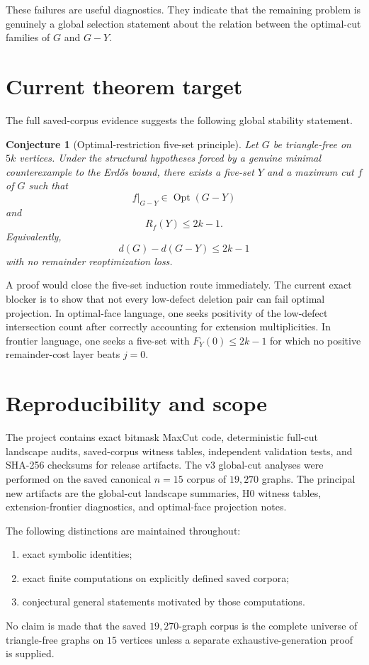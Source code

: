 \documentclass[11pt]{article}
\newtheorem{conjecture}{Conjecture}
\newcommand{\dd}{d}
\newcommand{\Opt}{\operatorname{Opt}}
\begin{document}
These failures are useful diagnostics.  They indicate that the remaining
problem is genuinely a global selection statement about the relation
between the optimal-cut families of $G$ and $G-Y$.

\section{Current theorem target}

The full saved-corpus evidence suggests the following global stability
statement.

\begin{conjecture}[Optimal-restriction five-set principle]
Let $G$ be triangle-free on $5k$ vertices.  Under the structural hypotheses
forced by a genuine minimal counterexample to the Erd\H{o}s bound, there
exists a five-set $Y$ and a maximum cut $f$ of $G$ such that
\[
f|_{G-Y}\in\Opt(G-Y)
\]
and
\[
R_f(Y)\le 2k-1.
\]
Equivalently,
\[
\dd(G)-\dd(G-Y)\le2k-1
\]
with no remainder reoptimization loss.
\end{conjecture}

A proof would close the five-set induction route immediately.  The current
exact blocker is to show that not every low-defect deletion pair can fail
optimal projection.  In optimal-face language, one seeks positivity of the
low-defect intersection count after correctly accounting for extension
multiplicities.  In frontier language, one seeks a five-set with
$F_Y(0)\le2k-1$ for which no positive remainder-cost layer beats $j=0$.

\section{Reproducibility and scope}

The project contains exact bitmask MaxCut code, deterministic full-cut
landscape audits, saved-corpus witness tables, independent validation tests,
and SHA-256 checksums for release artifacts.  The v3 global-cut analyses
were performed on the saved canonical $n=15$ corpus of $19{,}270$ graphs.
The principal new artifacts are the global-cut landscape summaries, H0
witness tables, extension-frontier diagnostics, and optimal-face projection
notes.

The following distinctions are maintained throughout:
\begin{enumerate}
\item exact symbolic identities;
\item exact finite computations on explicitly defined saved corpora;
\item conjectural general statements motivated by those computations.
\end{enumerate}
No claim is made that the saved $19{,}270$-graph corpus is the complete
universe of triangle-free graphs on $15$ vertices unless a separate
exhaustive-generation proof is supplied.
\end{document}

